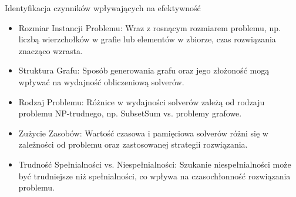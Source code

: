 \begin{frame}{Identyfikacja czynników wpływających na efektywność}
	\begin{itemize}
		\item Rozmiar Instancji Problemu:
		Wraz z rosnącym rozmiarem problemu, np. liczbą wierzchołków w grafie lub elementów w zbiorze, czas rozwiązania znacząco wzrasta.
		\item Struktura Grafu:
		Sposób generowania grafu oraz jego złożoność mogą wpływać na wydajność obliczeniową solverów.
		\item Rodzaj Problemu:
		Różnice w wydajności solverów zależą od rodzaju problemu NP-trudnego, np. SubsetSum vs. problemy grafowe.
		\item Zużycie Zasobów:
		Wartość czasowa i pamięciowa solverów różni się w zależności od problemu oraz zastosowanej strategii rozwiązania.
		\item Trudność Spełnialności vs. Niespełnialności:
		Szukanie niespełnialności może być trudniejsze niż spełnialności, co wpływa na czasochłonność rozwiązania problemu.
	\end{itemize}
\end{frame}
	
